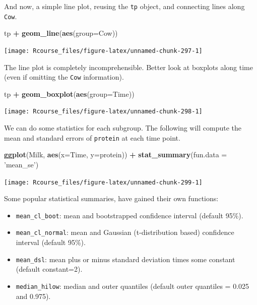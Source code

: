 \documentclass[]{book}
\newenvironment{Shaded}{\begin{snugshade}}{\end{snugshade}}
\newcommand{\DataTypeTok}[1]{\textcolor[rgb]{0.13,0.29,0.53}{#1}}
\newcommand{\KeywordTok}[1]{\textcolor[rgb]{0.13,0.29,0.53}{\textbf{#1}}}
\newcommand{\NormalTok}[1]{#1}
\newcommand{\OperatorTok}[1]{\textcolor[rgb]{0.81,0.36,0.00}{\textbf{#1}}}
\newcommand{\StringTok}[1]{\textcolor[rgb]{0.31,0.60,0.02}{#1}}
\providecommand{\tightlist}{%
  \setlength{\itemsep}{0pt}\setlength{\parskip}{0pt}}
\theoremstyle{definition}
\theoremstyle{definition}
\theoremstyle{definition}
\theoremstyle{remark}
\begin{document}
And now, a simple line plot, reusing the \texttt{tp} object, and connecting lines along \texttt{Cow}.

\begin{Shaded}
\begin{Highlighting}[]
\NormalTok{tp }\OperatorTok{+}\StringTok{ }\KeywordTok{geom_line}\NormalTok{(}\KeywordTok{aes}\NormalTok{(}\DataTypeTok{group=}\NormalTok{Cow))}
\end{Highlighting}
\end{Shaded}

\texttt{[image: Rcourse\_files/figure-latex/unnamed-chunk-297-1]}

The line plot is completely incomprehensible.
Better look at boxplots along time (even if omitting the \texttt{Cow} information).

\begin{Shaded}
\begin{Highlighting}[]
\NormalTok{tp }\OperatorTok{+}\StringTok{ }\KeywordTok{geom_boxplot}\NormalTok{(}\KeywordTok{aes}\NormalTok{(}\DataTypeTok{group=}\NormalTok{Time))}
\end{Highlighting}
\end{Shaded}

\texttt{[image: Rcourse\_files/figure-latex/unnamed-chunk-298-1]}

We can do some statistics for each subgroup.
The following will compute the mean and standard errors of \texttt{protein} at each time point.

\begin{Shaded}
\begin{Highlighting}[]
\KeywordTok{ggplot}\NormalTok{(Milk, }\KeywordTok{aes}\NormalTok{(}\DataTypeTok{x=}\NormalTok{Time, }\DataTypeTok{y=}\NormalTok{protein)) }\OperatorTok{+}
\StringTok{  }\KeywordTok{stat_summary}\NormalTok{(}\DataTypeTok{fun.data =} \StringTok{'mean_se'}\NormalTok{)}
\end{Highlighting}
\end{Shaded}

\texttt{[image: Rcourse\_files/figure-latex/unnamed-chunk-299-1]}

Some popular statistical summaries, have gained their own functions:

\begin{itemize}
\tightlist
\item
  \texttt{mean\_cl\_boot}: mean and bootstrapped confidence interval (default 95\%).
\item
  \texttt{mean\_cl\_normal}: mean and Gaussian (t-distribution based) confidence interval (default 95\%).
\item
  \texttt{mean\_dsl}: mean plus or minus standard deviation times some constant (default constant=2).
\item
  \texttt{median\_hilow}: median and outer quantiles (default outer quantiles = 0.025 and 0.975).
\end{itemize}
\end{document}
